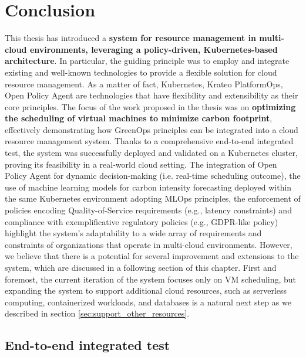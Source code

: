 \chapter{Conclusion}
\label{cha:conclusion}

This thesis has introduced a \textbf{system for resource management in multi-cloud environments, leveraging a policy-driven, Kubernetes-based architecture}. 
In particular, the guiding principle was to employ and integrate existing and well-known technologies to provide a flexible solution for cloud resource management.
As a matter of fact, Kubernetes, Krateo PlatformOps, Open Policy Agent are technologies that have flexibility and extensibility as their core principles.
The focus of the work proposed in the thesis was on \textbf{optimizing the scheduling of virtual machines to minimize carbon footprint}, effectively demonstrating how GreenOps principles can be integrated into a cloud resource management system.
Thanks to a comprehensive end-to-end integrated test, the system was successfully deployed and validated on a Kubernetes cluster, proving its feasibility in a real-world cloud setting.
The integration of Open Policy Agent for dynamic decision-making (i.e. real-time scheduling outcome), the use of machine learning models for carbon intensity forecasting deployed within the same Kubernetes environment adopting MLOps principles, the enforcement of policies encoding Quality-of-Service requirements (e.g., latency constraints) and compliance with exemplificative regulatory policies (e.g., GDPR-like policy) highlight the system’s adaptability to a wide array of requirements and constraints of organizations that operate in multi-cloud environments.
However, we believe that there is a potential for several improvement and extensions to the system, which are discussed in a following section of this chapter.
First and foremost, the current iteration of the system focuses only on VM scheduling, but expanding the system to support additional cloud resources, such as serverless computing, containerized workloads, and databases is a natural next step as we described in section \ref{sec:support_other_resources}.

\section{End-to-end integrated test}

